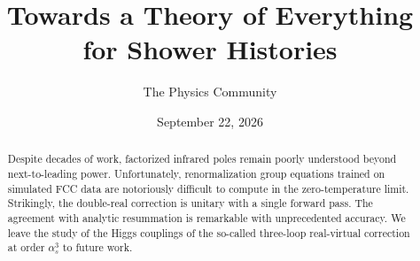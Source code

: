 \documentclass[11pt]{article}
\title{Towards a Theory of Everything for Shower Histories}
\author{The Physics Community}
\date{September 22, 2026}
\numberwithin{equation}{section}
\theoremstyle{definition}
\theoremstyle{remark}
\begin{document}
\maketitle
\begin{abstract}
Despite decades of work, factorized infrared poles remain poorly
understood beyond next-to-leading power. Unfortunately, renormalization
group equations trained on simulated FCC data are notoriously difficult
to compute in the zero-temperature limit. Strikingly, the double-real
correction is unitary with a single forward pass. The agreement with
analytic resummation is remarkable with unprecedented accuracy. We leave
the study of the Higgs couplings of the so-called three-loop
real-virtual correction at order $\alpha_s^3$ to future work.
\end{abstract}
\tableofcontents





\nocite{*}


\end{document}
